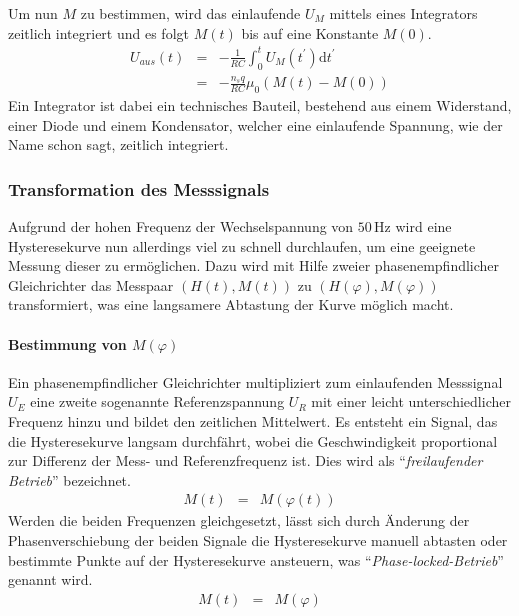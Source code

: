 \documentclass[12pt,a4paper]{scrartcl}
\numberwithin{equation}{section} %
\renewcommand{\[}{} %
\renewcommand{\]}{\noindent} %
\begin{document}
Um nun \(M\) zu bestimmen, wird das einlaufende \(U_M\) mittels eines
Integrators zeitlich integriert und es folgt \(M(t)\) bis auf eine
Konstante \(M(0)\). \[
\begin{eqnarray}
    U_{aus}(t)
        &=& -\frac{1}{R C} \int_{0}^{t} U_M(t^{\prime}) \mathrm dt^{\prime} \\
        &=& -\frac{n_s q}{R C} \mu_0 (M(t) - M(0))
\end{eqnarray}
\] Ein Integrator ist dabei ein technisches Bauteil, bestehend aus einem
Widerstand, einer Diode und einem Kondensator, welcher eine einlaufende
Spannung, wie der Name schon sagt, zeitlich integriert.

\hypertarget{transformation-des-messsignals}{%
\subsubsection{Transformation des
Messsignals}\label{transformation-des-messsignals}}

Aufgrund der hohen Frequenz der Wechselspannung von \(50\,\mathrm{Hz}\)
wird eine Hysteresekurve nun allerdings viel zu schnell durchlaufen, um
eine geeignete Messung dieser zu ermöglichen. Dazu wird mit Hilfe zweier
phasenempfindlicher Gleichrichter das Messpaar \((H(t), M(t))\) zu
\((H(\varphi), M(\varphi))\) transformiert, was eine langsamere
Abtastung der Kurve möglich macht.

\hypertarget{bestimmung-von-mvarphi}{%
\paragraph{\texorpdfstring{Bestimmung von
\(M(\varphi)\)}{Bestimmung von M(\textbackslash varphi)}}\label{bestimmung-von-mvarphi}}

Ein phasenempfindlicher Gleichrichter multipliziert zum einlaufenden
Messsignal \(U_E\) eine zweite sogenannte Referenzspannung \(U_R\) mit
einer leicht unterschiedlicher Frequenz hinzu und bildet den zeitlichen
Mittelwert. Es entsteht ein Signal, das die Hysteresekurve langsam
durchfährt, wobei die Geschwindigkeit proportional zur Differenz der
Mess- und Referenzfrequenz ist. Dies wird als ``\emph{freilaufender
Betrieb}'' bezeichnet. \[
\begin{eqnarray}
    M(t) &=& M(\varphi(t))
\end{eqnarray}
\] Werden die beiden Frequenzen gleichgesetzt, lässt sich durch Änderung
der Phasenverschiebung der beiden Signale die Hysteresekurve manuell
abtasten oder bestimmte Punkte auf der Hysteresekurve ansteuern, was
``\emph{Phase-locked-Betrieb}'' genannt wird. \[
\begin{eqnarray}
    M(t) &=& M(\varphi)
\end{eqnarray}
\]
\end{document}
